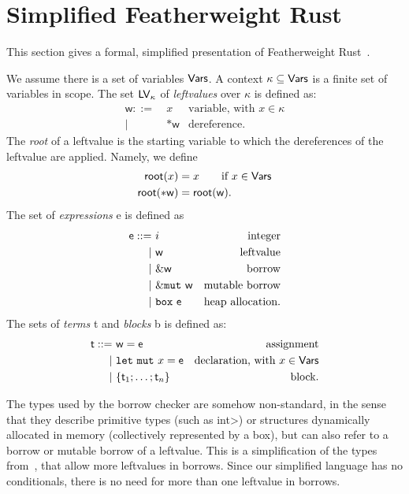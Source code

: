 \section{Simplified Featherweight Rust}\label{sec:featherweight}

This section gives a formal, simplified presentation of Featherweight
Rust~\cite{Pearce21}.

\begin{definition}
  We assume there is a set of variables $\mathsf{Vars}$.
  A context $\kappa\subseteq\mathsf{Vars}$ is a finite set of variables in scope.
  The set $\mathsf{LV}_\kappa$ of \emph{leftvalues} over $\kappa$ is defined as:
  \begin{align*}
    \mathsf{w} ::= &\ x & \text{variable, with $x\in\kappa$}\\
    | &\ \mathtt{*}\mathsf{w} & \text{dereference.}
  \end{align*}
  The \emph{root} of a leftvalue is the starting variable to which the dereferences of the
  leftvalue are applied. Namely, we define
  \begin{align*}
    \mathsf{root}(x) &= x\qquad\text{if $x\in\mathsf{Vars}$}\\
    \mathsf{root}(\mathtt{*}\mathsf{w}) &= \mathsf{root}(\mathsf{w}).
  \end{align*}
  The set of \emph{expressions} \textsf{e} is defined as
  \begin{align*}
    \mathsf{e} ::= &\ i & \text{integer}\\
    | &\ \mathsf{w} & \text{leftvalue}\\
    | &\ \&\mathsf{w} & \text{borrow}\\
    | &\ \&\mathtt{mut}\ \mathsf{w} & \text{mutable borrow}\\
    | &\ \mathtt{box}\ \mathsf{e} & \text{heap allocation.}
  \end{align*}
  The sets of \emph{terms} \textsf{t} and \emph{blocks} \textsf{b} is defined as:
  \begin{align*}
    \mathsf{t} ::= &\ \mathsf{w}=\mathsf{e} & \text{assignment}\\
    | &\ \mathtt{let\ mut}\ x=\mathsf{e} & \text{declaration, with $x\in\mathsf{Vars}$}\\
    | &\ \{\mathsf{t}_1;\ldots;\mathsf{t}_n\} & \text{block.}
  \end{align*}
\end{definition}

The types used by the borrow checker are somehow non-standard, in the sense
that they describe primitive types (such as \<int>) or structures
dynamically allocated in memory (collectively represented by a box), but can also refer to
a borrow or mutable borrow of a leftvalue.
This is a simplification of the types from~\cite{Pearce21}, that allow more leftvalues
in borrows. Since our simplified language has no conditionals, there is no need for
more than one leftvalue in borrows.

